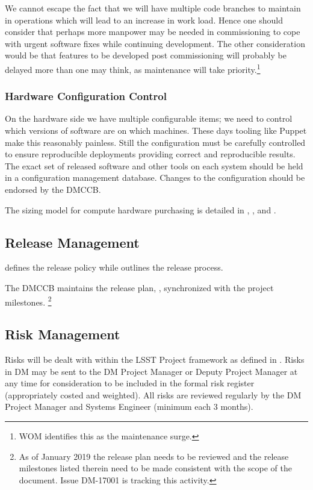 We cannot escape the fact that we  will have multiple code branches to maintain in operations which will lead to an increase in work load.
Hence one should consider that perhaps more manpower may be needed in commissioning to cope with urgent software fixes while continuing development.
The other consideration would be that features to be developed post commissioning will probably be delayed more than one may think, as maintenance will take priority.\footnote{WOM identifies this as the maintenance surge.}

\subsubsection{Hardware Configuration Control}

On the hardware side we have multiple configurable items; we need to control which versions of software are on which machines. These days tooling like Puppet make this reasonably painless. Still the \gls{configuration}  must be carefully controlled to ensure reproducible deployments providing correct and reproducible results. The exact set of released software and other tools on each system should be held in a \gls{configuration} management database.
Changes to the \gls{configuration} should be endorsed by the \gls{DMCCB}.

The sizing model for compute hardware purchasing is detailed in , , and .

\subsection {Release Management } \label{sect:release}

 defines the release policy while  outlines the release process.

The \gls{DMCCB} maintains the release plan, , synchronized with the project milestones.
\footnote{As of January 2019 the release plan needs to be reviewed and the release milestones listed therein need to be made consistent with the scope of the document.
Issue \gls{DM}-17001 is tracking this activity.}



\subsection {Risk Management } \label{sect:risk}

Risks will be dealt with within the \gls{LSST} Project framework as defined in .
Risks in \gls{DM} may be sent to the \gls{DM} \gls{Project Manager} or Deputy \gls{Project Manager} at any time for consideration to be included in the formal risk register (appropriately costed and weighted). All risks are reviewed regularly by the \gls{DM} \gls{Project Manager} and \gls{Systems Engineer} (minimum each 3 months).


